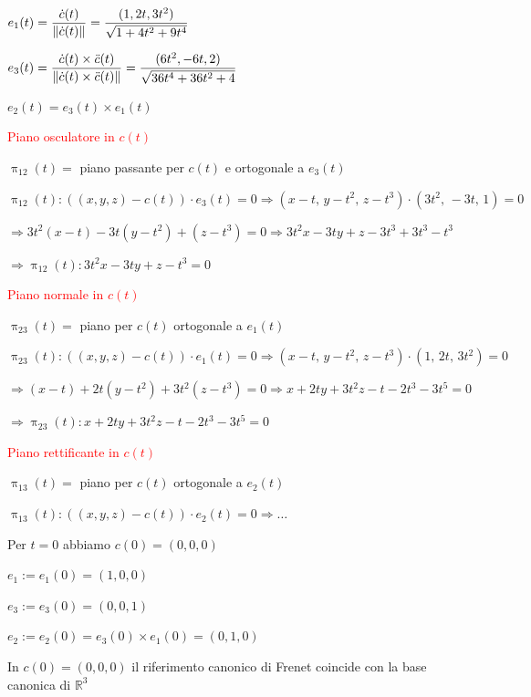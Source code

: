 \begin{esempio}
        $\displaystyle e_1(t) = \frac{\dot{c}(t)}{\lVert\dot{c}(t)\rVert} = \frac{(1, 2t, 3t^2)}{\sqrt{1 + 4t^2 + 9t^4}}$

        $\displaystyle e_3(t) = \frac{\dot{c}(t) \times \ddot{c}(t)}{\lVert\dot{c}(t) \times \ddot{c}(t)\rVert} = \frac{(6t^2, -6t, 2)}{\sqrt{36t^4 + 36t^2 + 4}}$

        $\displaystyle e_2(t) = e_3(t) \times e_1(t)$

        \textcolor{red}{Piano osculatore in $c(t)$}

        $\uppi_{12}(t)=$ piano passante per $c(t)$ e ortogonale a $e_3(t)$

        $\uppi_{12}(t) \colon \left( \left(x,y,z\right) - c (t) \right) \cdot e_3(t) = 0 \Rightarrow \left(x-t, \, y-t^2, \,z-t^3\right) \cdot \left(3t^2, \, -3t, \, 1\right)=0$
        
        $\Rightarrow 3t^2(x-t) - 3t(y-t^2) + (z-t^3) = 0 \Rightarrow 3t^2 x - 3t y + z - 3t^3 + 3t^3 -t^3$

        $\Rightarrow  \uppi_{12}(t) \colon  3t^2 x - 3t y + z - t^3 = 0$

        \textcolor{red}{Piano normale in $c(t)$}

        $\uppi_{23}(t)=$ piano per $c(t)$ ortogonale a $e_1(t)$

        $\uppi_{23}(t) \colon \left( \left(x,y,z\right) - c (t) \right) \cdot e_1(t) = 0 \Rightarrow \left(x-t, \, y-t^2, \,z-t^3\right) \cdot \left(1, \, 2t, \, 3t^2\right)=0$

        $\Rightarrow (x-t) + 2t(y-t^2) + 3t^2(z-t^3) = 0 \Rightarrow x + 2ty + 3t^2 z - t - 2t^3 - 3t^5 = 0$

        $\Rightarrow  \uppi_{23}(t) \colon  x + 2ty + 3t^2 z - t - 2t^3 - 3t^5 = 0$

        \textcolor{red}{Piano rettificante in $c(t)$}

        $\uppi_{13}(t)=$ piano per $c(t)$ ortogonale a $e_2(t)$

        $\uppi_{13}(t) \colon \left( \left(x,y,z\right) - c (t) \right) \cdot e_2(t) = 0 \Rightarrow \dots$

        Per $t=0$ abbiamo $c(0) = (0,0,0)$ 

        $e_1 := e_1(0) = (1,0,0)$

        $e_3 := e_3(0) = (0,0,1)$

        $e_2 := e_2(0) = e_3(0) \times e_1(0) =(0,1,0)$

        In $c(0)=(0,0,0)$ il riferimento canonico di Frenet coincide con la base canonica di $\mathbb{R}^3$


\end{esempio}
